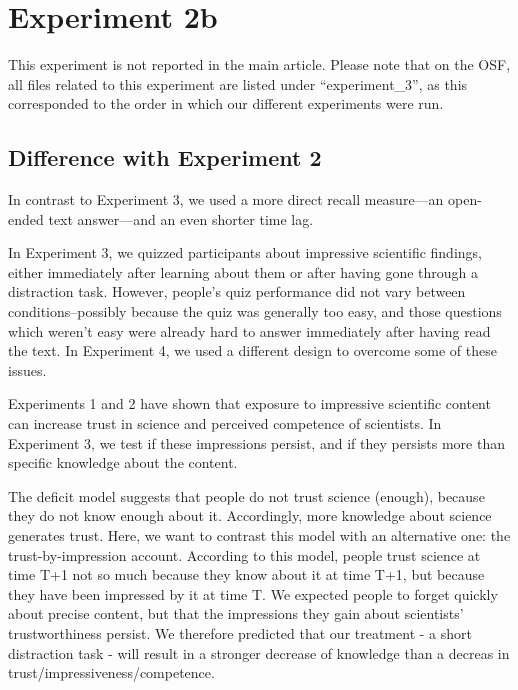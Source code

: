 \documentclass[
  english,
  doc,floatsintext]{apa6}
\begin{document}
\clearpage

\section{Experiment 2b}\label{exp2b}

This experiment is not reported in the main article. Please note that on the OSF, all files related to this experiment are listed under ``experiment\_3'', as this corresponded to the order in which our different experiments were run.

\subsection{Difference with Experiment 2}\label{difference-with-experiment-2}

\FloatBarrier

In contrast to Experiment 3, we used a more direct recall measure---an open-ended text answer---and an even shorter time lag.

In Experiment 3, we quizzed participants about impressive scientific findings, either immediately after learning about them or after having gone through a distraction task. However, people's quiz performance did not vary between conditions--possibly because the quiz was generally too easy, and those questions which weren't easy were already hard to answer immediately after having read the text. In Experiment 4, we used a different design to overcome some of these issues.

Experiments 1 and 2 have shown that exposure to impressive scientific content can increase trust in science and perceived competence of scientists. In Experiment 3, we test if these impressions persist, and if they persists more than specific knowledge about the content.

The deficit model suggests that people do not trust science (enough), because they do not know enough about it. Accordingly, more knowledge about science generates trust. Here, we want to contrast this model with an alternative one: the trust-by-impression account. According to this model, people trust science at time T+1 not so much because they know about it at time T+1, but because they have been impressed by it at time T. We expected people to forget quickly about precise content, but that the impressions they gain about scientists' trustworthiness persist. We therefore predicted that our treatment - a short distraction task - will result in a stronger decrease of knowledge than a decreas in trust/impressiveness/competence.
\end{document}
